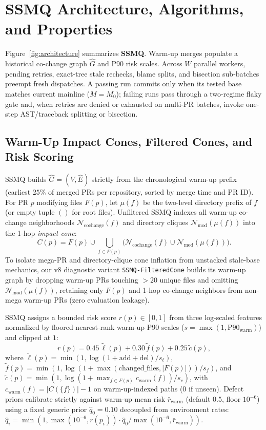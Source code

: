 \section{SSMQ Architecture, Algorithms, and Properties}
\label{sec:methodology}

Figure~\ref{fig:architecture} summarizes \textbf{SSMQ}. Warm-up merges populate a historical co-change graph $\hat{G}$ and P90 risk scales. Across $W$ parallel workers, pending retries, exact-tree stale rechecks, blame splits, and bisection sub-batches preempt fresh dispatches. A passing run commits only when its tested base matches current mainline ($M{=}M_0$); failing runs pass through a two-regime flaky gate and, when retries are denied or exhausted on multi-PR batches, invoke one-step AST/traceback splitting or bisection.



\subsection{Warm-Up Impact Cones, Filtered Cones, and Risk Scoring}
SSMQ builds $\hat{G}=(V,\hat{E})$ strictly from the chronological warm-up prefix (earliest $25\%$ of merged PRs per repository, sorted by merge time and PR ID). For PR $p$ modifying files $F(p)$, let $\mu(f)$ be the two-level directory prefix of $f$ (or empty tuple $()$ for root files). Unfiltered SSMQ indexes all warm-up co-change neighborhoods $\mathcal{N}_{\text{cochange}}(f)$ and directory cliques $\mathcal{N}_{\text{mod}}(\mu(f))$ into the 1-hop \emph{impact cone}:
\begin{equation}
C(p) = F(p) \cup \bigcup_{f \in F(p)} \Big(\mathcal{N}_{\text{cochange}}(f) \cup \mathcal{N}_{\text{mod}}(\mu(f))\Big).
\label{eq:cone}
\end{equation}
To isolate mega-PR and directory-clique cone inflation from unstacked stale-base mechanics, our v8 diagnostic variant \texttt{SSMQ-FilteredCone} builds its warm-up graph by dropping warm-up PRs touching $>20$ unique files and omitting $\mathcal{N}_{\text{mod}}(\mu(f))$, retaining only $F(p)$ and 1-hop co-change neighbors from non-mega warm-up PRs (zero evaluation leakage).

SSMQ assigns a bounded risk score $r(p) \in [0, 1]$ from three log-scaled features normalized by floored nearest-rank warm-up P90 scales ($s = \max(1, \text{P90}_{\text{warm}})$) and clipped at $1$:
\begin{equation}
r(p) = 0.45\,\tilde{\ell}(p) + 0.30\,\tilde{f}(p) + 0.25\,\tilde{c}(p),
\label{eq:risk}
\end{equation}
where $\tilde{\ell}(p)=\min(1,\log(1+\text{add}+\text{del})/s_\ell)$, $\tilde{f}(p)=\min(1,\log(1+\max(\text{changed\_files},|F(p)|))/s_f)$, and $\tilde{c}(p)=\min(1,\log(1+\max_{f\in F(p)} c_{\text{warm}}(f))/s_c)$, with $c_{\text{warm}}(f)=|C(\{f\})|-1$ on warm-up-indexed paths ($0$ if unseen). Defect priors calibrate strictly against warm-up mean risk $\bar{r}_{\text{warm}}$ (default $0.5$, floor $10^{-6}$) using a fixed generic prior $\hat{q}_0=0.10$ decoupled from environment rates: $\hat{q}_i = \min(1, \max(10^{-6}, r(p_i)) \cdot \hat{q}_0 / \max(10^{-6}, \bar{r}_{\text{warm}}))$.

